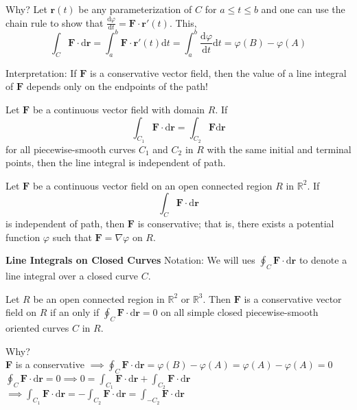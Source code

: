 \documentclass[../calc3.tex]{subfiles}
\begin{document}
Why? Let $\textbf{r}(t)$ be any parameterization of $C$ for $a\leq t\leq b$ and one can use the chain rule to show that $\frac{\mathrm{d}\varphi}{\mathrm{d}t}=\textbf{F}\cdot\textbf{r}'(t)$. This, 
\[\int_C \textbf{F}\cdot\mathrm{d}\textbf{r}=\int_a^b \textbf{F}\cdot\textbf{r}'(t)\mathrm{d}t = \int_a^b \frac{\mathrm{d}\varphi}{\mathrm{d}t}\mathrm{d}t = \varphi(B)-\varphi(A)\]

Interpretation: If $\textbf{F}$ is a conservative vector field, then the value of a line integral of $\textbf{F}$ depends only on the endpoints of the path!

\begin{definition}
    Let $\textbf{F}$ be a continuous vector field with domain $R$. If 
    \[\int_{C_1}\textbf{F}\cdot\mathrm{d}\textbf{r}=\int_{C_2}\textbf{F}\mathrm{d}\textbf{r}\]
    for all piecewise-smooth curves $C_1$ and $C_2$ in $R$ with the same initial and terminal points, then the line integral is 
    independent of path.
\end{definition}

\begin{theorem}
    Let $\textbf{F}$ be a continuous vector field on an open connected region $R$ in $\mathbb{R}^2$. If 
    \[\int_C \textbf{F}\cdot\mathrm{d}\textbf{r}\]
    is independent of path, then $\textbf{F}$ is conservative; that is, there exists a potential function $\varphi$ such that $\textbf{F}=\nabla\varphi$ on $R$.
\end{theorem}

\textbf{Line Integrals on Closed Curves}
Notation: We will ues $\oint_C \textbf{F}\cdot\mathrm{d}\textbf{r}$ to denote a line integral over a closed curve $C$.

\begin{theorem}
    Let $R$ be an open connected region in $\mathbb{R}^2$ or $\mathbb{R}^3$. Then $\textbf{F}$ is a conservative vector field on $R$ 
    if an only if $\oint_C \textbf{F}\cdot\mathrm{d}\textbf{r}=0$ on all simple closed piecewise-smooth oriented 
    curves $C$ in $R$. 
\end{theorem}

Why?\\
\textbf{F} is a conservative $\implies \oint_C \textbf{F}\cdot\mathrm{d}\textbf{r}=\varphi(B)-\varphi(A)=\varphi(A)-\varphi(A)=0$\\
$\oint_C \textbf{F}\cdot\mathrm{d}\textbf{r}=0 \implies 0 = \int_{C_1}\textbf{F}\cdot\mathrm{d}\textbf{r}+\int_{C_2}\textbf{F}\cdot\mathrm{d}\textbf{r}$\\
$\implies \int_{C_1}\textbf{F}\cdot\mathrm{d}\textbf{r}=-\int_{C_2}\textbf{F}\cdot\mathrm{d}\textbf{r}=\int_{-C_2}\textbf{F}\cdot\mathrm{d}\textbf{r}$
\end{document}
